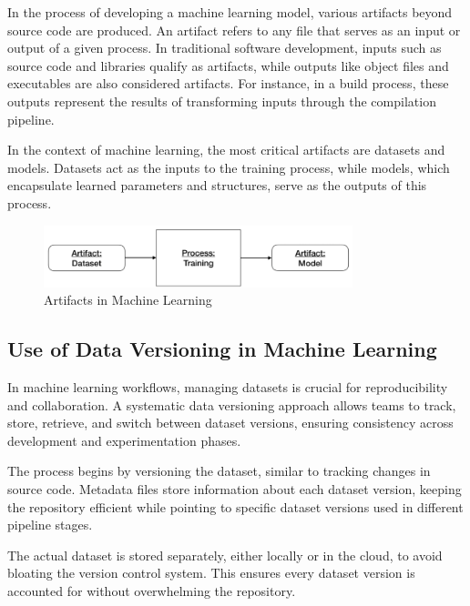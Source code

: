 In the process of developing a machine learning model, 
various artifacts beyond source code are produced. An 
artifact refers to any file that serves as an input or 
output of a given process. In traditional software 
development, inputs such as source code and libraries 
qualify as artifacts, while outputs like object files 
and executables are also considered artifacts. For 
instance, in a build process, these outputs represent 
the results of transforming inputs through the 
compilation pipeline. \cite{wandb, pulicharla2024data}

In the context of machine learning, the most critical 
artifacts are datasets and models. Datasets act as the 
inputs to the training process, while models, which 
encapsulate learned parameters and structures, serve as 
the outputs of this process. \cite{pulicharla2024data}
\begin{figure}[H]
    \centering
    \includegraphics[width=0.8\textwidth]{fig/ml-artifacts.png}
    \caption{Artifacts in Machine Learning \cite{wandb}}
    \label{fig:ml-artifacts}
\end{figure}

\subsection{Use of Data Versioning in Machine Learning}


In machine learning workflows, managing datasets is crucial 
for reproducibility and collaboration. A systematic data 
versioning approach allows teams to track, store, retrieve, 
and switch between dataset versions, ensuring consistency 
across development and experimentation phases. 
\cite{wandb, pulicharla2024data}

The process begins by versioning the dataset, similar to 
tracking changes in source code. Metadata files store 
information about each dataset version, keeping the 
repository efficient while pointing to specific dataset 
versions used in different pipeline stages. 
\cite{pulicharla2024data, opendatascience}

The actual dataset is stored separately, either locally or 
in the cloud, to avoid bloating the version control system. 
This ensures every dataset version is accounted for without 
overwhelming the repository. \cite{opendatascience}

